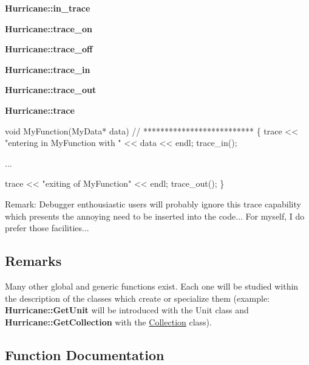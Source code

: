 \begin{DoxyItemize}
\item {\bfseries Hurricane\+::in\+\_\+trace} 
\item {\bfseries Hurricane\+::trace\+\_\+on} 
\item {\bfseries Hurricane\+::trace\+\_\+off} 
\item {\bfseries Hurricane\+::trace\+\_\+in} 
\item {\bfseries Hurricane\+::trace\+\_\+out} 
\item {\bfseries Hurricane\+::trace} 
\end{DoxyItemize}


\begin{DoxyCode}
\textcolor{keywordtype}{void} MyFunction(MyData* data)
\textcolor{comment}{// **************************}
\{
   trace << \textcolor{stringliteral}{"entering in MyFunction with "} << data << endl;
   trace\_in();
 
   ...
 
   trace << \textcolor{stringliteral}{"exiting of MyFunction"} << endl;
   trace\_out();
\}
\end{DoxyCode}
 \begin{DoxyParagraph}{Remark\+: Debugger enthousiastic users will probably ignore this trace }
capability which presents the annoying need to be inserted into the code... For myself, I do prefer those facilities...
\end{DoxyParagraph}
\hypertarget{group__Generalities_secGeneralitiesRemarks}{}\subsection{Remarks}\label{group__Generalities_secGeneralitiesRemarks}
Many other global and generic functions exist. Each one will be studied within the description of the classes which create or specialize them (example\+: {\bfseries Hurricane\+::\+Get\+Unit} will be introduced with the Unit class and {\bfseries Hurricane\+::\+Get\+Collection} with the \mbox{\hyperlink{classHurricane_1_1Collection}{Collection}} class). 

\subsection{Function Documentation}
\mbox{\label{group__Generalities_ga93af87d1b7b19294382ba6dae51d0363}} 
